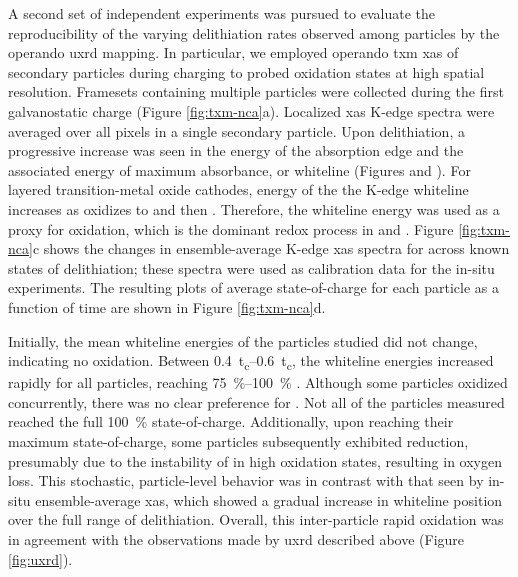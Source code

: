 \documentclass{article}
\begin{document}
A second set of independent experiments was pursued to evaluate the
reproducibility of the varying delithiation rates observed among
particles by the operando \gls{uxrd} mapping. In particular, we
employed operando \Gls{txm} \gls{xas} of \nca{} secondary particles
during charging to probed  oxidation states at high spatial
resolution. Framesets containing multiple particles were collected
during the first galvanostatic charge (Figure
\ref{fig:txm-nca}a). Localized \gls{xas} K-edge spectra were averaged
over all pixels in a single secondary particle. Upon delithiation, a
progressive increase was seen in the energy of the absorption edge and
the associated energy of maximum absorbance, or whiteline (Figures
 and ). For layered
transition-metal oxide cathodes, energy of the the  K-edge
whiteline increases as  oxidizes to  and then
. Therefore, the whiteline energy was used as a proxy for
 oxidation, which is the dominant redox process in \nca{} and
\nmc{}. Figure \ref{fig:txm-nca}c shows the changes in
ensemble-average  K-edge \gls{xas} spectra for \nca{} across
known states of delithiation; these spectra were used as calibration
data for the in-situ experiments. The resulting plots of average
state-of-charge for each particle as a function of time are shown in
Figure \ref{fig:txm-nca}d.

Initially, the mean whiteline energies of the particles studied did
not change, indicating no  oxidation. Between
\SIrange{0.4}{0.6}{t_c}, the whiteline energies increased rapidly for
all particles, reaching \SIrange{75}{100}{\percent} . Although some particles oxidized
concurrently, there was no clear preference for . Not all of the particles measured reached
the full \SI{100}{\percent} state-of-charge. Additionally, upon
reaching their maximum state-of-charge, some particles subsequently
exhibited  reduction, presumably due to the instability of
 in high oxidation states\citeme{}, resulting in oxygen
loss. This stochastic, particle-level behavior was in contrast with
that seen by in-situ ensemble-average \gls{xas}\cite{deb2005}, which
showed a gradual increase in whiteline position over the full range of
delithiation. Overall, this inter-particle rapid oxidation was in
agreement with the observations made by \gls{uxrd} described above
(Figure \ref{fig:uxrd}).
\end{document}
